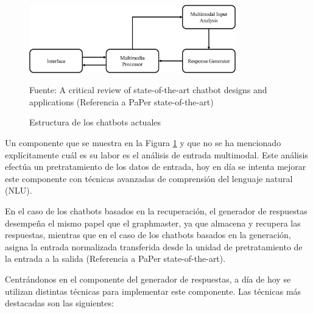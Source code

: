 \begin{figure}[h]
\centering
\includegraphics[width=0.8\textwidth]{imagenes/02_EstadoDelArte/estructura_state_of_art.jpg}
\begin{center}
Fuente: A critical review of state-of-the-art chatbot designs and applications (Referencia a PaPer state-of-the-art)
\end{center}
\caption{Estructura de los chatbots actuales}
\label{fig:estructura_state_of_art}
\end{figure}

Un componente que se muestra en la Figura \ref{fig:estructura_state_of_art} y que no se ha mencionado explícitamente cuál es su labor es el análisis de entrada multimodal. Este análisis efectúa un pretratamiento de los datos de entrada, hoy en día se intenta mejorar este componente con técnicas avanzadas de comprensión del lenguaje natural (NLU).

En el caso de los chatbots basados en la recuperación, el generador de respuestas desempeña el mismo papel que el graphmaster, ya que almacena y recupera las respuestas, mientras que en el caso de los chatbots basados en la generación, asigna la entrada normalizada transferida desde la unidad de pretratamiento de la entrada a la salida (Referencia a PaPer state-of-the-art).

Centrándonos en el componente del generador de respuestas, a día de hoy se utilizan distintas técnicas para implementar este componente. Las técnicas más destacadas son las siguientes:

